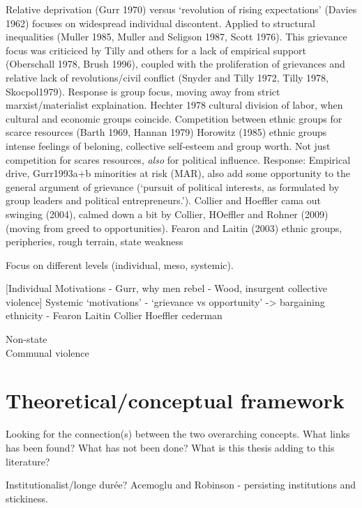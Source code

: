 \documentclass[12pt]{article}
\begin{document}
Relative deprivation (Gurr 1970) versus `revolution of rising expectations' (Davies
1962) focuses on widespread individual discontent. Applied to structural
inequalities (Muller 1985, Muller and Seligson 1987, Scott 1976). This grievance
focus was criticiced by Tilly and others for a lack of empirical support
(Oberschall 1978, Brush 1996), coupled with the proliferation of grievances and
relative lack of revolutions/civil conflict (Snyder and Tilly 1972, Tilly 1978,
Skocpol1979). Response is group focus, moving away from strict
marxist/materialist explaination. Hechter 1978 cultural division of labor, when
cultural and economic groups coincide. Competition between ethnic groups for
scarce resources (Barth 1969, Hannan 1979) Horowitz (1985) ethnic groups intense
feelings of beloning, collective self-esteem and group worth. Not just
competition for scares resources, \textit{also} for political influence.
Response: Empirical drive, Gurr1993a+b minorities at risk (MAR), also add some
opportunity to the general argument of grievance (`pursuit of political
interests, as formulated by group leaders and political entrepreneurs.').
Collier and Hoeffler cama out swinging (2004), calmed down a bit by Collier,
HOeffler and Rohner (2009) (moving from greed to opportunities). Fearon and
Laitin (2003) ethnic groups, peripheries, rough terrain, state weakness

Focus on different levels (individual, meso, systemic). 

[Individual Motivations - Gurr, why men rebel - Wood, insurgent collective violence]
Systemic `motivations' - `grievance vs opportunity' -> bargaining
ethnicity - Fearon  Laitin
Collier  Hoeffler 
cederman 



Non-state \\ 

Communal violence \\

\section{Theoretical/conceptual framework} \label{Theoretical/conceptual framework}

Looking for the connection(s) between the two overarching concepts. What links
has been found? What has not been done? What is this thesis adding to this
literature? 

Institutionalist/longe durée? Acemoglu and Robinson - persisting institutions
and stickiness.
\end{document}
